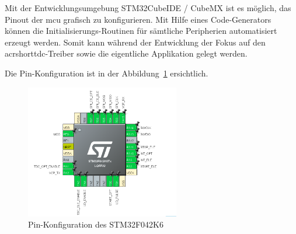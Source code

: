 Mit der Entwicklungsumgebung STM32CubeIDE / CubeMX \cite{st2025stm32cubeide} ist es möglich, das Pinout der
\acrshort{mcu} grafisch zu konfigurieren. Mit Hilfe eines Code-Generators können die Initialisierungs-Routinen für
sämtliche Peripherien automatisiert erzeugt werden. Somit kann während der Entwicklung der Fokus auf den
acrshort{tdc}-Treiber sowie die eigentliche Applikation gelegt werden.

Die Pin-Konfiguration ist in der Abbildung~\ref{fig:pinconfiguration_mcu} ersichtlich.

\begin{figure}[H]
    \centering
    \includegraphics[width=0.6\textwidth]{graphics/pinconfiguration_mcu.png}
    \caption{Pin-Konfiguration des STM32F042K6}\label{fig:pinconfiguration_mcu}
\end{figure}

\pagebreak
